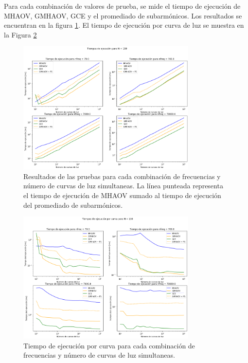 Para cada combinación de valores de prueba, se mide el tiempo de ejecución de MHAOV, GMHAOV, GCE y el promediado de subarmónicos. Los resultados se encuentran en la figura \ref{fig:benchmarks}. El tiempo de ejecución por curva de luz se muestra en la Figura \ref{fig:benchmark-por-curva}
\begin{figure}[H]
    \centering
    \includegraphics[width=0.8\textwidth]{figs/benchmarks-total.png}
    \caption{Resultados de las pruebas para cada combinación de frecuencias y número de curvas de luz simultaneas. La línea punteada representa el tiempo de ejecución de MHAOV sumado al tiempo de ejecución del promediado de subarmónicos.}
    \label{fig:benchmarks}
\end{figure}

\begin{figure}[H]

    \centering
    \includegraphics[width=0.8\textwidth]{figs/benchmarks.png}
    \caption{Tiempo de ejecución por curva para cada combinación de frecuencias y número de curvas de luz simultaneas.}
\label{fig:benchmark-por-curva}
\end{figure}

